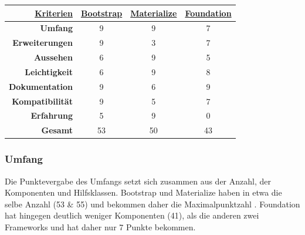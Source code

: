 	\begin{center}
		\begin{table}
			\centering
		\begin{tabular}{rccc}
			\hline
			\multicolumn{1}{|r|}{{\underline{\textbf{Kriterien}}}} & \multicolumn{1}{c|}{{\underline{\textbf{Bootstrap}}}} & \multicolumn{1}{c|}{{ \underline{\textbf{Materialize}}}} & \multicolumn{1}{c|}{{\underline{\textbf{Foundation}}}} \\ \hline
			\multicolumn{1}{|r|}{\textbf{Umfang}}          & \multicolumn{1}{c|}{9}                        & \multicolumn{1}{c|}{9}                          & \multicolumn{1}{c|}{7}                         \\ \hline
			\multicolumn{1}{|r|}{\textbf{Erweiterungen}}   & \multicolumn{1}{c|}{9}                        & \multicolumn{1}{c|}{3}                          & \multicolumn{1}{c|}{7}                         \\ \hline
			\multicolumn{1}{|r|}{\textbf{Aussehen}}        & \multicolumn{1}{c|}{6}                        & \multicolumn{1}{c|}{9}                          & \multicolumn{1}{c|}{5}                         \\ \hline
			\multicolumn{1}{|r|}{\textbf{Leichtigkeit}}    & \multicolumn{1}{c|}{6}                        & \multicolumn{1}{c|}{9}                          & \multicolumn{1}{c|}{8}                         \\ \hline
			\multicolumn{1}{|r|}{\textbf{Dokumentation}}   & \multicolumn{1}{c|}{9}                        & \multicolumn{1}{c|}{6}                          & \multicolumn{1}{c|}{9}                         \\ \hline
			\multicolumn{1}{|r|}{\textbf{Kompatibilität}}  & \multicolumn{1}{c|}{9}                        & \multicolumn{1}{c|}{5}                          & \multicolumn{1}{c|}{7}                         \\ \hline
			\multicolumn{1}{|r|}{\textbf{Erfahrung}}       & \multicolumn{1}{c|}{5}                        & \multicolumn{1}{c|}{9}                          & \multicolumn{1}{c|}{0}                         \\ \hline
			\textbf{Gesamt}                                & 53                                            & 50                                              & 43                                            
		\end{tabular}
	\end{table}
	\end{center}
\subsubsection{Umfang}
\label{chapter:study-frontend-vergleich-umfang}
Die Punktevergabe des Umfangs setzt sich zusammen aus der Anzahl, der Komponenten und Hilfsklassen. Bootstrap und Materialize haben in etwa die selbe Anzahl (53 \& 55) und bekommen daher die Maximalpunktzahl \cite{bootstrap-docu,WebDocMaterialize,foundation-webdocu}. Foundation hat hingegen deutlich weniger Komponenten (41), als die anderen zwei Frameworks und hat daher nur 7 Punkte bekommen.
